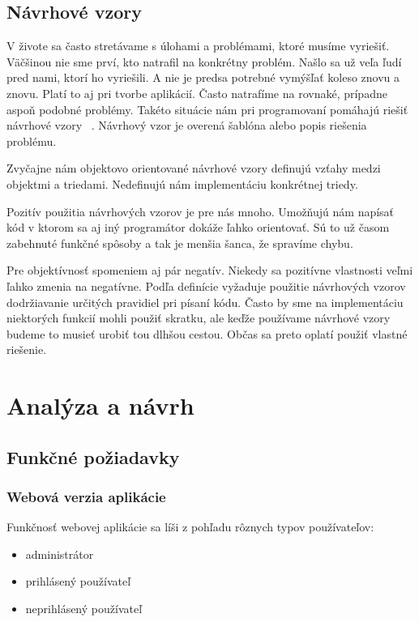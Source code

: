 \documentclass[12pt,oneside]{book}
\begin{document}
\section{Návrhové vzory}
V živote sa často stretávame s úlohami a problémami, ktoré musíme vyriešiť. Väčšinou nie sme prví, kto natrafil na konkrétny problém. Našlo sa už veľa ľudí pred nami, ktorí ho vyriešili. A nie je predsa potrebné vymýšľať koleso znovu a znovu. Platí to aj pri tvorbe aplikácií.  Často natrafíme na rovnaké, prípadne aspoň podobné problémy. Takéto situácie nám pri programovaní pomáhajú riešiť návrhové vzory \cite{NavrhoveVzory}\ . Návrhový vzor je overená šablóna alebo popis riešenia problému.

Zvyčajne nám objektovo orientované návrhové vzory definujú vzťahy medzi objektmi a triedami. Nedefinujú nám implementáciu konkrétnej triedy.  

Pozitív použitia návrhových vzorov je pre nás mnoho. Umožňujú nám napísať kód v ktorom sa aj iný programátor dokáže ľahko orientovať. Sú to už časom zabehnuté funkčné spôsoby a tak je menšia šanca, že spravíme chybu. 

Pre objektívnosť spomeniem aj pár negatív. Niekedy sa pozitívne vlastnosti veľmi ľahko zmenia na negatívne. Podľa definície vyžaduje použitie návrhových vzorov dodržiavanie určitých pravidiel pri písaní kódu. Často by sme na implementáciu niektorých funkcií mohli použiť skratku, ale keďže používame návrhové vzory budeme to musieť urobiť tou dlhšou cestou. Občas sa preto oplatí použiť vlastné riešenie.

\chapter{Analýza a návrh}
\section{Funkčné požiadavky}
\subsection{Webová verzia aplikácie}
Funkčnosť webovej aplikácie sa líši z pohľadu rôznych typov používateľov:
\begin{itemize}
\item{administrátor}
\item{prihlásený používateľ}
\item{neprihlásený používateľ}
\end{itemize}
\end{document}
